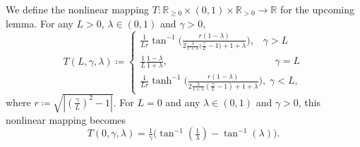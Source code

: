 We define the nonlinear mapping $T: \mathbb{R}_{\geq0}\times(0,1)\times\mathbb{R}_{>0} \rightarrow \mathbb{R}$ for the upcoming lemma. For any $L > 0$, $\lambda \in (0,1)$ and $\gamma > 0$, 
\begin{equation*}
    T(L,\gamma,\lambda) \coloneqq
    \begin{cases}
    \tfrac{1}{Lr}\tan^{-1}\bigg(\tfrac{r(1-\lambda)}{2\tfrac{\lambda}{1+\lambda}\big(\tfrac{\gamma}{L}-1\big)+1+\lambda} \bigg), \;\;\;  \gamma > L
    \\
    \tfrac{1}{L} \tfrac{1-\lambda}{1+\lambda}, \qquad\qquad\qquad\qquad\qquad \;\;\; \gamma = L
    \\
    \tfrac{1}{Lr}\tanh^{-1}\bigg(\tfrac{r(1-\lambda)}{2\tfrac{\lambda}{1+\lambda}\left(\tfrac{\gamma}{L}-1\right)+1+\lambda} \bigg), \; \gamma < L ,
    \end{cases}   
\end{equation*}
where $r \coloneqq \sqrt{|\left(\tfrac{\gamma}{L}\right)^2 -1|}$. For $L = 0$ and any $\lambda \in (0,1)$ and $\gamma > 0$, this nonlinear mapping becomes
$$T(0,\gamma, \lambda) = \tfrac{1}{\gamma} \big(\tan^{-1}(\tfrac{1}{\lambda}) - \tan^{-1}(\lambda) \big).$$ 
%
%
